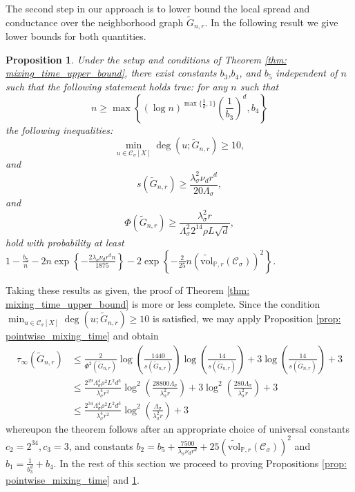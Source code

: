 \documentclass[11pt,twoside]{article}
\newtheorem{proposition}{Proposition}
\theoremstyle{definition}
\newcommand{\set}[1]{\left\{#1\right\}}
\newcommand{\vol}{\mathrm{vol}}
\newcommand{\1}{\mathbbm{1}}
\newcommand{\Xbf}{X}
\newcommand{\Pbb}{\mathbb{P}}
\newcommand{\Cset}{\mathcal{C}}
\newcommand{\Csig}{\Cset_{\sigma}}
\begin{document}
The second step in our approach is to lower bound the local spread and conductance over the neighborhood graph $\widetilde{G}_{n,r}$. In the following result we give lower bounds for both quantities. 
\begin{proposition}
	\label{prop: local_spread_conductance}
	Under the setup and conditions of Theorem \ref{thm: mixing_time_upper_bound}, there exist constants $b_3$,$b_4$, and $b_5$ independent of $n$ such that the following statement holds true: for any $n$ such that
	\begin{equation*}
	n \geq \max\left\{(\log n)^{\max\{\frac{3}{d},1\}}\left(\frac{1}{b_3}\right)^d, b_4\right\}
	\end{equation*}
	the following inequalities:
	\begin{equation}
	\label{eqn:min_degree}
	\min_{u \in \Csig[\Xbf]} \deg(u;\widetilde{G}_{n,r}) \geq 10,
	\end{equation}
	and
	\begin{equation}
	\label{eqn: local_spread}
	s(\widetilde{G}_{n,r}) \geq \frac{\lambda_{\sigma}^2 \nu_d r^d}{20\Lambda_{\sigma}},
	\end{equation}
	and
	\begin{equation}
	\label{eqn: conductance}
	\Phi(\widetilde{G}_{n,r}) \geq \frac{\lambda_{\sigma}^2 r}{\Lambda_{\sigma}^2 2^{14} \rho L \sqrt{d}},
	\end{equation}
	hold with probability at least $1 - \frac{b_5}{n} - 2n\exp\set{-\frac{2\lambda_{\sigma} \nu_d r^d n}{1875}} - 2\exp\set{-\frac{2}{25}n(\widetilde{\vol}_{\Pbb,r}(\Csig))^2}$.
\end{proposition}

Taking these results as given, the proof of Theorem \ref{thm: mixing_time_upper_bound} is more or less complete. Since the condition $\min_{u \in \Csig[\Xbf]} \deg(u;\widetilde{G}_{n,r}) \geq 10$ is satisfied, we may apply Proposition \ref{prop: pointwise_mixing_time} and obtain
\begin{align*}
\tau_{\infty}(\widetilde{G}_{n,r}) & \leq  \frac{2}{\Phi^2(\widetilde{G}_{n,r})} \log \left(\frac{1440}{s(\widetilde{G}_{n,r})}\right)\log \left(\frac{14}{s(\widetilde{G}_{n,r})}\right)  + 3 \log \left(\frac{14}{s(\widetilde{G}_{n,r})}\right) + 3
\\
& \leq \frac{2^{29}\Lambda_{\sigma}^4\rho^2L^2 d^3}{\lambda_{\sigma}^4 r^2} \log^2\left(\frac{28800\Lambda_{\sigma}}{\lambda_{\sigma}^2 r}\right) + 3 \log^2\left(\frac{280\Lambda_{\sigma}}{\lambda_{\sigma}^2 r}\right) + 3 \\
& \leq \frac{2^{34}\Lambda_{\sigma}^4\rho^2L^2 d^3}{\lambda_{\sigma}^4 r^2} \log^2\left(\frac{\Lambda_{\sigma}}{\lambda_{\sigma}^2 r}\right) + 3
\end{align*}
whereupon the theorem follows after an appropriate choice of universal constants $c_2 = 2^{34}, c_3 = 3$, and constants $b_2 = b_5 + \frac{7500}{\lambda_{\sigma}\nu_dr^d} + 25(\widetilde{\vol}_{\Pbb,r}(\Csig))^2$ and $b_1 = \frac{1}{b_3^d} + b_4$. In the rest of this section we proceed to proving Propositions \ref{prop: pointwise_mixing_time} and \ref{prop: local_spread_conductance}.
\end{document}
